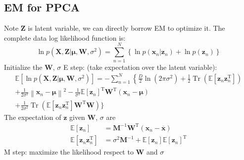 \documentclass{article}
\begin{document}
\subsection{EM for PPCA}
Note $\mathbf{Z}$ is latent variable, we can directly borrow EM to optimize it. The complete data log likelihood function is:
\begin{equation*}
\ln p\left(\mathbf{X}, \mathbf{Z} | \boldsymbol{\mu}, \mathbf{W}, \sigma^{2}\right)=\sum_{n=1}^{N}\left\{\ln p\left(\mathbf{x}_{n} | \mathbf{z}_{n}\right)+\ln p\left(\mathbf{z}_{n}\right)\right\}
\end{equation*}
Initialize the $\mathbf{W}$, $\sigma$
E step: (take expectation over the latent variable):
\begin{equation*}
\begin{array}{l}{\mathbb{E}\left[\ln p\left(\mathbf{X}, \mathbf{Z} | \boldsymbol{\mu}, \mathbf{W}, \sigma^{2}\right)\right]=-\sum_{n=1}^{N}\left\{\frac{D}{2} \ln \left(2 \pi \sigma^{2}\right)+\frac{1}{2} \operatorname{Tr}\left(\mathbb{E}\left[\mathbf{z}_{n} \mathbf{z}_{n}^{\mathrm{T}}\right]\right)\right.} \\ {+\frac{1}{2 \sigma^{2}}\left\|\mathbf{x}_{n}-\boldsymbol{\mu}\right\|^{2}-\frac{1}{\sigma^{2}} \mathbb{E}\left[\mathbf{z}_{n}\right]^{\mathrm{T}} \mathbf{W}^{\mathrm{T}}\left(\mathbf{x}_{n}-\boldsymbol{\mu}\right)} \\ {+\frac{1}{2 \sigma^{2}} \operatorname{Tr}\left(\mathbb{E}\left[\mathbf{z}_{n} \mathbf{z}_{n}^{\mathrm{T}}\right] \mathbf{W}^{\mathrm{T}} \mathbf{W}\right) \}}\end{array}
\end{equation*}
The expectation of $\mathbf{z}$ given $\mathbf{W}$, $\sigma$ are
\begin{equation}
\begin{aligned} \mathbb{E}\left[\mathbf{z}_{n}\right] &=\mathbf{M}^{-1} \mathbf{W}^{\mathrm{T}}\left(\mathbf{x}_{n}-\overline{\mathbf{x}}\right) \\ \mathbb{E}\left[\mathbf{z}_{n} \mathbf{z}_{n}^{\mathrm{T}}\right] &=\sigma^{2} \mathbf{M}^{-1}+\mathbb{E}\left[\mathbf{z}_{n}\right] \mathbb{E}\left[\mathbf{z}_{n}\right]^{\mathrm{T}} \end{aligned}
\end{equation}
M step: maximize the likelihood respect to $\mathbf{W}$ and $\sigma$
\end{document}
